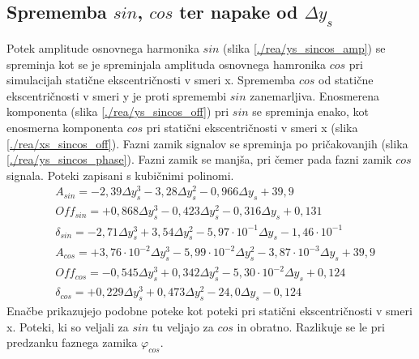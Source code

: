 \subsection{Sprememba $sin$, $cos$ ter napake od $\Delta y_s$}
Potek amplitude osnovnega harmonika $sin$ (slika \ref{./rea/ys_sincos_amp}) se spreminja kot se je spreminjala amplituda osnovnega hamronika $cos$ pri simulacijah statične ekscentričnosti v smeri x. Sprememba $cos$ od statične ekscentričnosti v smeri y je proti spremembi $sin$ zanemarljiva. Enosmerena komponenta (slika \ref{./rea/ys_sincos_off}) pri $sin$ se spreminja enako, kot enosmerna komponenta $cos$ pri statični ekscentričnosti v smeri x (slika \ref{./rea/xs_sincos_off}).  Fazni zamik signalov se spreminja po pričakovanjih (slika \ref{./rea/ys_sincos_phase}). Fazni zamik se manjša, pri čemer pada fazni zamik $cos$ signala.%
Poteki zapisani s kubičnimi polinomi.
\begin{eqnarray}
&A_{sin} = -2,39\Delta y_s^3-3,28\Delta y_s^2-0,966\Delta y_s+39,9\\     
&Off_{sin} = +0,868\Delta y_s^3-0,423\Delta y_s^2-0,316\Delta y_s+0,131\\   
&\delta_{sin} = -2,71\Delta y_s^3+3,54\Delta y_s^2-5,97\cdot 10^{-1}\Delta y_s-1,46\cdot 10^{-1}\\
&A_{cos} = +3,76\cdot 10^{-2}\Delta y_s^3-5,99\cdot 10^{-2}\Delta y_s^2-3,87\cdot 10^{-3}\Delta y_s+39,9\\     
&Off_{cos} = -0,545\Delta y_s^3+0,342\Delta y_s^2-5,30\cdot 10^{-2}\Delta y_s+0,124\\   
&\delta_{cos} = +0,229\Delta y_s^3+0,473\Delta y_s^2-24,0\Delta y_s-0,124  
\end{eqnarray}
Enačbe prikazujejo podobne poteke kot poteki pri statični ekscentričnosti v smeri x. Poteki, ki so veljali za $sin$ tu veljajo za $cos$ in obratno. Razlikuje se le pri predzanku faznega zamika $\varphi_{cos}$. 

